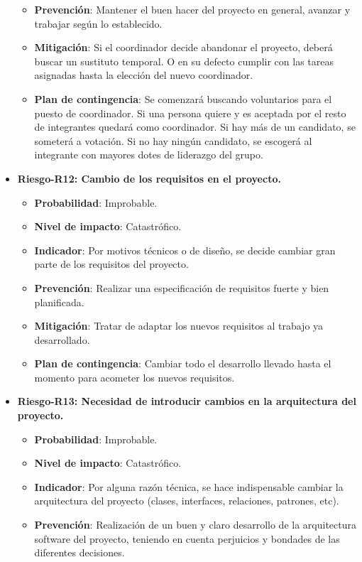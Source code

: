 \begin{itemize}
\begin{itemize}
		\item{ \bf Prevención}: Mantener el buen hacer del proyecto en general, avanzar y trabajar según lo establecido.
		\item{ \bf Mitigación}: Si el coordinador decide abandonar el proyecto, deberá buscar un sustituto temporal. O en su defecto cumplir con las tareas asignadas hasta la elección del nuevo coordinador.
		\item{ \bf Plan de contingencia}: Se comenzará buscando voluntarios para el puesto de coordinador. Si una persona quiere y es aceptada por el resto de integrantes quedará como coordinador. Si hay más de un candidato, se someterá a votación. Si no hay ningún candidato, se escogerá al integrante con mayores dotes de liderazgo del grupo.\\
		\end{itemize}
\item { \bf Riesgo-R12: Cambio de los requisitos en el proyecto.}
		\begin{itemize}	
		\item{ \bf Probabilidad}: Improbable.
		\item{ \bf Nivel de impacto}: Catastrófico.
		\item{ \bf Indicador}: Por motivos técnicos o de diseño, se decide cambiar gran parte de los requisitos del proyecto.
		\item{ \bf Prevención}: Realizar una especificación de requisitos fuerte y bien planificada. 
		\item{ \bf Mitigación}: Tratar de adaptar los nuevos requisitos al trabajo ya desarrollado.
		\item{ \bf Plan de contingencia}: Cambiar todo el desarrollo llevado hasta el momento para acometer los nuevos requisitos.\\
		\end{itemize}
\item { \bf Riesgo-R13: Necesidad de introducir cambios en la arquitectura del proyecto.}
		\begin{itemize}	
		\item{ \bf Probabilidad}: Improbable.
		\item{ \bf Nivel de impacto}: Catastrófico.
		\item{ \bf Indicador}: Por alguna razón técnica, se hace indispensable cambiar la arquitectura del proyecto (clases, interfaces, relaciones, patrones, etc).
		\item{ \bf Prevención}: Realización de un buen y claro desarrollo de la arquitectura software del proyecto, teniendo en cuenta perjuicios y bondades de las diferentes decisiones.

\end{itemize}
\end{itemize}
